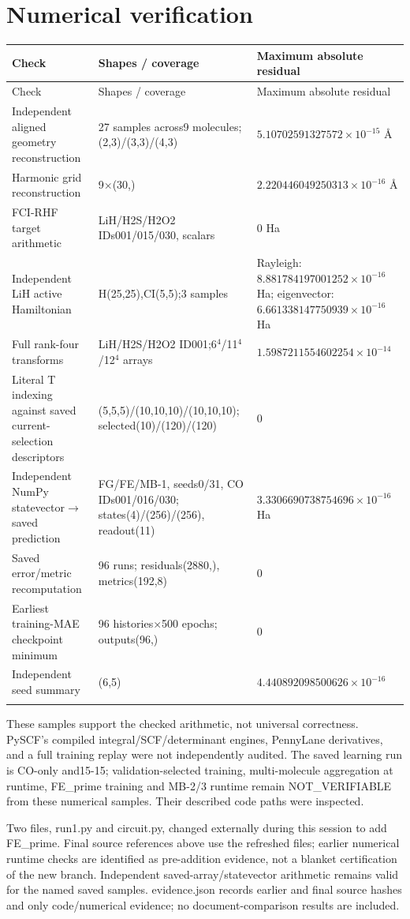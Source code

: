 \documentclass[10pt,a4paper]{article}
\begin{document}
\section*{Numerical verification}
\small\begin{longtable}{p{.29\linewidth}p{.36\linewidth}p{.25\linewidth}}\toprule Check & Shapes / coverage & Maximum absolute residual\\\midrule\endfirsthead\toprule Check & Shapes / coverage & Maximum absolute residual\\\midrule\endhead
Independent aligned geometry reconstruction & 27 samples across9 molecules; (2,3)/(3,3)/(4,3) & $5.10702591327572\times10^{-15}$ \AA{}\\\addlinespace
Harmonic grid reconstruction & 9$\times$(30,) & $2.220446049250313\times10^{-16}$ \AA{}\\\addlinespace
FCI-RHF target arithmetic & LiH/H2S/H2O2 IDs001/015/030, scalars & 0 Ha\\\addlinespace
Independent LiH active Hamiltonian & H(25,25),CI(5,5);3 samples & Rayleigh: $8.881784197001252\times10^{-16}$ Ha; eigenvector: $6.661338147750939\times10^{-16}$ Ha\\\addlinespace
Full rank-four transforms & LiH/H2S/H2O2 ID001;6$^4$/11$^4$/12$^4$ arrays & $1.5987211554602254\times10^{-14}$\\\addlinespace
Literal T indexing against saved current-selection descriptors & (5,5,5)/(10,10,10)/(10,10,10); selected(10)/(120)/(120) & 0\\\addlinespace
Independent NumPy statevector$\to$saved prediction & FG/FE/MB-1, seeds0/31, CO IDs001/016/030; states(4)/(256)/(256), readout(11) & $3.3306690738754696\times10^{-16}$ Ha\\\addlinespace
Saved error/metric recomputation & 96 runs; residuals(2880,), metrics(192,8) & 0\\\addlinespace
Earliest training-MAE checkpoint minimum & 96 histories$\times$500 epochs; outputs(96,) & 0\\\addlinespace
Independent seed summary & (6,5) & $4.440892098500626\times10^{-16}$\\\addlinespace
\bottomrule\end{longtable}\normalsize
These samples support the checked arithmetic, not universal correctness. PySCF's compiled integral/SCF/determinant engines, PennyLane derivatives, and a full training replay were not independently audited. The saved learning run is CO-only and15-15; validation-selected training, multi-molecule aggregation at runtime, FE\_prime training and MB-2/3 runtime remain NOT\_VERIFIABLE from these numerical samples. Their described code paths were inspected.

Two files, run1.py and circuit.py, changed externally during this session to add FE\_prime. Final source references above use the refreshed files; earlier numerical runtime checks are identified as pre-addition evidence, not a blanket certification of the new branch. Independent saved-array/statevector arithmetic remains valid for the named saved samples. evidence.json records earlier and final source hashes and only code/numerical evidence; no document-comparison results are included.
\end{document}
